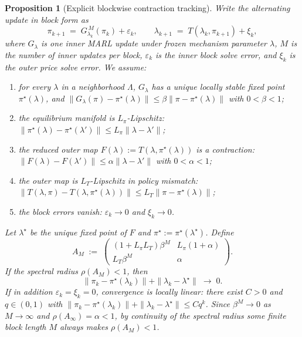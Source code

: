 \documentclass{article}
\newtheorem{proposition}{Proposition}
\begin{document}
\begin{proposition}[Explicit blockwise contraction tracking]
    \label{pro:Blockwise}
    Write the alternating update in block form as
    $$\pi_{k+1} \;=\; G_{\lambda_k}^{\,M}(\pi_k) + \varepsilon_k, \qquad \lambda_{k+1} \;=\; T(\lambda_k, \pi_{k+1}) + \xi_k,$$
    where $G_\lambda$ is one inner MARL update under frozen mechanism parameter $\lambda$, $M$ is the number of inner updates per block, $\varepsilon_k$ is the inner block solve error, and $\xi_k$ is the outer price solve error. We assume:

    \begin{enumerate}
        \item for every $\lambda$ in a neighborhood $\Lambda$, $G_\lambda$ has a unique locally stable fixed point $\pi^\star(\lambda)$, and $\|G_\lambda(\pi) - \pi^\star(\lambda)\| \le \beta \|\pi - \pi^\star(\lambda)\|$ with $0 < \beta < 1$;
        \item the equilibrium manifold is $L_\pi$-Lipschitz: $\|\pi^\star(\lambda) - \pi^\star(\lambda')\| \le L_\pi \|\lambda - \lambda'\|$;
        \item the reduced outer map $F(\lambda) := T(\lambda, \pi^\star(\lambda))$ is a contraction: $\|F(\lambda) - F(\lambda')\| \le \alpha \|\lambda - \lambda'\|$ with $0 < \alpha < 1$;
        \item the outer map is $L_T$-Lipschitz in policy mismatch: $\|T(\lambda, \pi) - T(\lambda, \pi^\star(\lambda))\| \le L_T \|\pi - \pi^\star(\lambda)\|$;
        \item the block errors vanish: $\varepsilon_k \to 0$ and $\xi_k \to 0$.
    \end{enumerate}

    Let $\lambda^\star$ be the unique fixed point of $F$ and $\pi^\star := \pi^\star(\lambda^\star)$. Define
    $$A_M \;:=\; \begin{pmatrix} (1 + L_\pi L_T)\beta^M & L_\pi(1+\alpha) \\ L_T \beta^M & \alpha \end{pmatrix}.$$
    If the spectral radius $\rho(A_M) < 1$, then
    $$\|\pi_k - \pi^\star(\lambda_k)\| + \|\lambda_k - \lambda^\star\| \;\longrightarrow\; 0.$$
    If in addition $\varepsilon_k = \xi_k = 0$, convergence is locally linear: there exist $C > 0$ and $q \in (0,1)$ with $\|\pi_k - \pi^\star(\lambda_k)\| + \|\lambda_k - \lambda^\star\| \le C q^k$. Since $\beta^M \to 0$ as $M \to \infty$ and $\rho(A_\infty) = \alpha < 1$, by continuity of the spectral radius some finite block length $M$ always makes $\rho(A_M) < 1$.    
\end{proposition}
\end{document}
